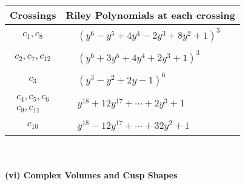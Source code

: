 \documentclass[1p]{elsarticle_modified}
\theoremstyle{definition}
\begin{document}
\begin{tabular}{m{50pt}|m{274pt}}
Crossings & \hspace{64pt}Riley Polynomials at each crossing \\
\hline $$\begin{aligned}c_{1},c_{8}\end{aligned}$$&$\begin{aligned}
&(y^6- y^5+4 y^4-2 y^3+8 y^2+1)^3
\end{aligned}$\\
\hline $$\begin{aligned}c_{2},c_{7},c_{12}\end{aligned}$$&$\begin{aligned}
&(y^6+3 y^5+4 y^4+2 y^3+1)^3
\end{aligned}$\\
\hline $$\begin{aligned}c_{3}\end{aligned}$$&$\begin{aligned}
&(y^3- y^2+2 y-1)^6
\end{aligned}$\\
\hline $$\begin{aligned}c_{4},c_{5},c_{6}\\c_{9},c_{11}\end{aligned}$$&$\begin{aligned}
&y^{18}+12 y^{17}+\cdots+2 y^3+1
\end{aligned}$\\
\hline $$\begin{aligned}c_{10}\end{aligned}$$&$\begin{aligned}
&y^{18}-12 y^{17}+\cdots+32 y^2+1
\end{aligned}$\\
\hline
\end{tabular}\\~\\
\newpage\flushleft \textbf{(vi) Complex Volumes and Cusp Shapes}
\end{document}
